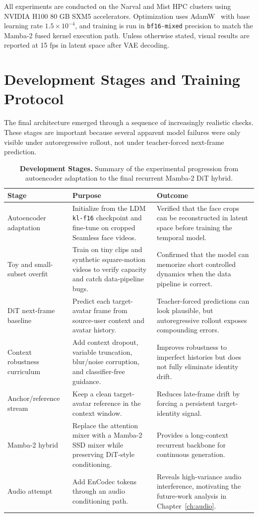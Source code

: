 \documentclass[12pt,letterpaper]{report}
\begin{document}
All experiments are conducted on the Narval and Mist HPC clusters using NVIDIA H100 80 GB SXM5 accelerators. Optimization uses AdamW~\cite{loshchilov2019decoupled} with base learning rate $1.5 \times 10^{-4}$, and training is run in \texttt{bf16-mixed} precision to match the Mamba-2 fused kernel execution path. Unless otherwise stated, visual results are reported at 15 fps in latent space after VAE decoding.

\section{Development Stages and Training Protocol}

The final architecture emerged through a sequence of increasingly realistic checks. These stages are important because several apparent model failures were only visible under autoregressive rollout, not under teacher-forced next-frame prediction.

\begin{table}[H]
\centering
\small
\begin{tabular}{@{}p{}p{}p{}@{}}
\toprule
\textbf{Stage} & \textbf{Purpose} & \textbf{Outcome} \\
\midrule
Autoencoder adaptation & Initialize from the LDM \texttt{kl-f16} checkpoint and fine-tune on cropped Seamless face videos. & Verified that the face crops can be reconstructed in latent space before training the temporal model. \\
Toy and small-subset overfit & Train on tiny clips and synthetic square-motion videos to verify capacity and catch data-pipeline bugs. & Confirmed that the model can memorize short controlled dynamics when the data pipeline is correct. \\
DiT next-frame baseline & Predict each target-avatar frame from source-user context and avatar history. & Teacher-forced predictions can look plausible, but autoregressive rollout exposes compounding errors. \\
Context robustness curriculum & Add context dropout, variable truncation, blur/noise corruption, and classifier-free guidance. & Improves robustness to imperfect histories but does not fully eliminate identity drift. \\
Anchor/reference stream & Keep a clean target-avatar reference in the context window. & Reduces late-frame drift by forcing a persistent target-identity signal. \\
Mamba-2 hybrid & Replace the attention mixer with a Mamba-2 SSD mixer while preserving DiT-style conditioning. & Provides a long-context recurrent backbone for continuous generation. \\
Audio attempt & Add EnCodec tokens through an audio conditioning path. & Reveals high-variance audio interference, motivating the future-work analysis in Chapter~\ref{ch:audio}. \\
\bottomrule
\end{tabular}
\caption{\textbf{Development Stages.} Summary of the experimental progression from autoencoder adaptation to the final recurrent Mamba-2 DiT hybrid.}
\label{tab:training_stages}
\end{table}
\end{document}
